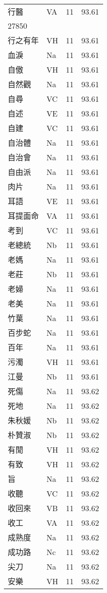 \documentclass[twocolumn]{book}
\begin{document}
\begin{supertabular}{llrr}
行醫 & VA & 11 &  93.61\\
27850\\
行之有年 & VH & 11 &  93.61\\
血淚 & Na & 11 &  93.61\\
自傲 & VH & 11 &  93.61\\
自然觀 & Na & 11 &  93.61\\
自尋 & VC & 11 &  93.61\\
自述 & VE & 11 &  93.61\\
自建 & VC & 11 &  93.61\\
自治體 & Na & 11 &  93.61\\
自治會 & Na & 11 &  93.61\\
自由派 & Na & 11 &  93.61\\
肉片 & Na & 11 &  93.61\\
耳語 & VE & 11 &  93.61\\
耳提面命 & VA & 11 &  93.61\\
考到 & VC & 11 &  93.61\\
老總統 & Nb & 11 &  93.61\\
老媽 & Na & 11 &  93.61\\
老莊 & Nb & 11 &  93.61\\
老婦 & Na & 11 &  93.61\\
老美 & Na & 11 &  93.61\\
竹葉 & Na & 11 &  93.61\\
百步蛇 & Na & 11 &  93.61\\
百年 & Na & 11 &  93.61\\
污濁 & VH & 11 &  93.61\\
江曼 & Nb & 11 &  93.61\\
死傷 & Na & 11 &  93.62\\
死地 & Na & 11 &  93.62\\
朱秋媛 & Nb & 11 &  93.62\\
朴贊淑 & Nb & 11 &  93.62\\
有閒 & VH & 11 &  93.62\\
有致 & VH & 11 &  93.62\\
旨 & Na & 11 &  93.62\\
收聽 & VC & 11 &  93.62\\
收回來 & VB & 11 &  93.62\\
收工 & VA & 11 &  93.62\\
成熟度 & Na & 11 &  93.62\\
成功路 & Nc & 11 &  93.62\\
尖刀 & Na & 11 &  93.62\\
安樂 & VH & 11 &  93.62\\

\end{supertabular}
\end{document}
